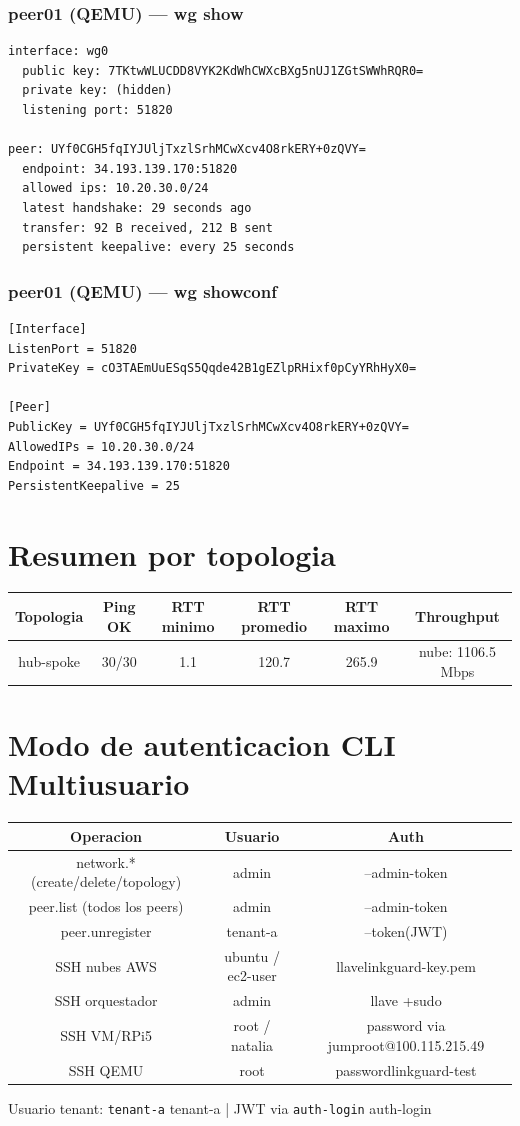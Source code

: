 \documentclass[11pt,a4paper]{article}
\begin{document}
\subsubsection*{peer01 (QEMU) — wg show}
\begin{lstlisting}
interface: wg0
  public key: 7TKtwWLUCDD8VYK2KdWhCWXcBXg5nUJ1ZGtSWWhRQR0=
  private key: (hidden)
  listening port: 51820

peer: UYf0CGH5fqIYJUljTxzlSrhMCwXcv4O8rkERY+0zQVY=
  endpoint: 34.193.139.170:51820
  allowed ips: 10.20.30.0/24
  latest handshake: 29 seconds ago
  transfer: 92 B received, 212 B sent
  persistent keepalive: every 25 seconds

\end{lstlisting}

\subsubsection*{peer01 (QEMU) — wg showconf}
\begin{lstlisting}
[Interface]
ListenPort = 51820
PrivateKey = cO3TAEmUuESqS5Qqde42B1gEZlpRHixf0pCyYRhHyX0=

[Peer]
PublicKey = UYf0CGH5fqIYJUljTxzlSrhMCwXcv4O8rkERY+0zQVY=
AllowedIPs = 10.20.30.0/24
Endpoint = 34.193.139.170:51820
PersistentKeepalive = 25

\end{lstlisting}

\section{Resumen por topologia}
\begin{longtable}{|c|c|c|c|c|c|}
\hline
Topologia & Ping OK & RTT minimo & RTT promedio & RTT maximo & Throughput \\ \hline
hub-spoke & 30/30 & 1.1 & 120.7 & 265.9 & nube: 1106.5 Mbps \\ \hline
\end{longtable}

\section{Modo de autenticacion CLI Multiusuario}
\begin{longtable}{|c|c|c|}
\hline
Operacion & Usuario & Auth \\ \hline
network.* (create/delete/topology) & admin & --admin-token \\ \hline
peer.list (todos los peers) & admin & --admin-token \\ \hline
peer.unregister & tenant-a & --token(JWT) \\ \hline
SSH nubes AWS & ubuntu / ec2-user & llavelinkguard-key.pem \\ \hline
SSH orquestador & admin & llave +sudo \\ \hline
SSH VM/RPi5 & root / natalia & password via jumproot@100.115.215.49 \\ \hline
SSH QEMU & root & passwordlinkguard-test \\ \hline
\end{longtable}

Usuario tenant:  \texttt{tenant-a} tenant-a  | JWT via  \texttt{auth-login} auth-login\\
\end{document}
